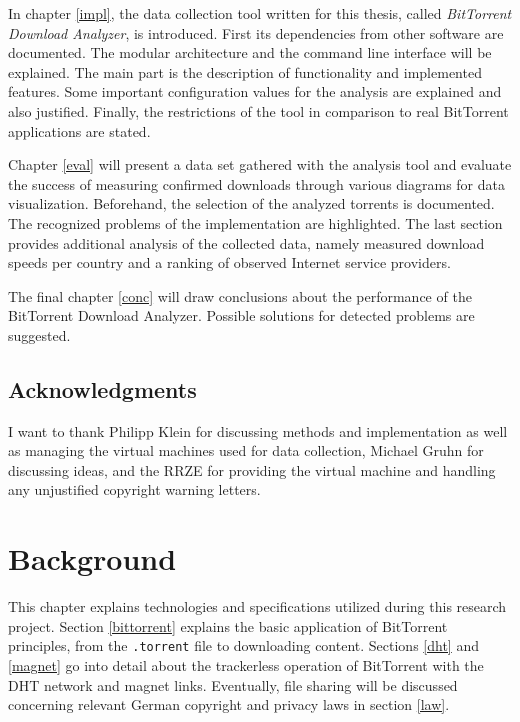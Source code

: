 \documentclass[10pt, a4paper, twoside=false, headsepline]{scrbook}
\renewcommand{\_}{\origunderscore\allowbreak}
\begin{document}
In chapter \ref{impl}, the data collection tool written for this thesis, called \emph{BitTorrent Download Analyzer}, is introduced. First its dependencies from other software are documented. The modular architecture and the command line interface will be explained. The main part is the description of functionality and implemented features. Some important configuration values for the analysis are explained and also justified. Finally, the restrictions of the tool in comparison to real BitTorrent applications are stated.

Chapter \ref{eval} will present a data set gathered with the analysis tool and evaluate the success of measuring confirmed downloads through various diagrams for data visualization. Beforehand, the selection of the  analyzed torrents is documented. The recognized problems of the implementation are highlighted. The last section provides additional analysis of the collected data, namely measured download speeds per country and a ranking of observed Internet service providers.

The final chapter \ref{conc} will draw conclusions about the performance of the BitTorrent Download Analyzer. Possible solutions for detected problems are suggested.

\section{Acknowledgments}
I want to thank Philipp Klein for discussing methods and implementation as well as managing the virtual machines used for data collection, Michael Gruhn for discussing ideas, and the RRZE for providing the virtual machine and handling any unjustified copyright warning letters.

\chapter{Background}
\label{backgr}
This chapter explains technologies and specifications utilized during this research project. Section \ref{bittorrent} explains the basic application of BitTorrent principles, from the \texttt{.torrent} file to downloading content. Sections \ref{dht} and \ref{magnet} go into detail about the trackerless operation of BitTorrent with the DHT network and magnet links. Eventually, file sharing will be discussed concerning relevant German copyright and privacy laws in section \ref{law}.
\end{document}
